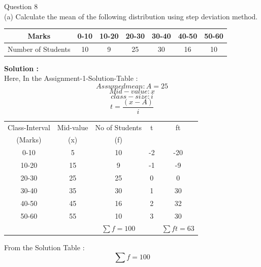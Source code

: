 \documentclass[journal,12pt,twocolumn]{IEEEtran}
\begin{document}

Question 8\\

(a)	Calculate the mean of the following distribution using step deviation method.\\

\begin{table}[h!]
\center
\resizebox{\columnwidth}{!}
{
\begin{tabular}{|c|c|c|c|c|c|c|}
\hline
Marks & 0-10 & 10-20 & 20-30 & 30-40 & 40-50 & 50-60 \\
\hline
Number of Students & 10 & 9 & 25 & 30 & 16 & 10 \\
\hline
\end{tabular}
}
\end{table}
\textbf{ Solution : }\\
Here, In the Assignment-1-Solution-Table :\\
\begin{equation*}
Assumed mean : A=25
\end{equation*}
\begin{equation*}
Mid-value : x
\end{equation*}
\begin{equation*}
class-size : i
\end{equation*}
\begin{equation*}
t = \frac{(x-A)}{i}
\end{equation*}
\begin{table}[h!]
\center
\resizebox{\columnwidth}{!}
{
\begin{tabular}{|c|c|c|c|c|}
\hline
Class-Interval & Mid-value & No of Students & t & ft\\
(Marks) & (x) & (f) & & \\
\hline
0-10 & 5 & 10 & -2 & -20 \\
\hline
10-20 & 15 & 9 & -1 & -9\\
\hline
20-30 & 25 & 25 & 0 & 0\\
\hline
30-40 & 35 & 30 & 1 & 30\\
\hline
40-50 & 45 & 16 & 2 & 32\\
\hline
50-60 & 55 & 10 & 3 & 30\\
\hline
 	&		 & 		$ 	\sum f = 100$ 		 &	 &	$ \sum ft = 63$		\\
 \hline
\end{tabular}
}
\end{table}
From the Solution Table :\\
\begin{equation*}
\sum f = 100
\end{equation*}
\end{document}
